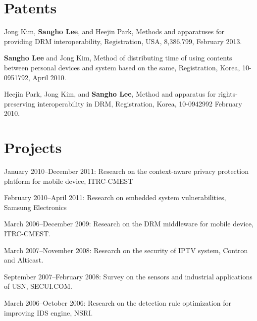 \documentclass[letterpaper]{article}
\renewenvironment{itemize}{
  \begin{list}{}{
    \setlength{\leftmargin}{1.5em}
  }
}{
  \end{list}
}
\begin{document}
\section*{Patents}
\begin{itemize}
  \item
 Jong Kim, {\bf Sangho Lee}, and Heejin Park,
 Methods and apparatuses for providing DRM interoperability,
 Registration, USA, 8,386,799,
 February 2013. 
 \item
 {\bf Sangho Lee} and Jong Kim,
 Method of distributing time of using contents between personal devices and system based on the same,
 Registration, Korea, 10-0951792,
 April 2010.
  \item
 Heejin Park, Jong Kim, and {\bf Sangho Lee},
 Method and apparatus for rights-preserving interoperability in DRM,
 Registration, Korea, 10-0942992
 February 2010. 
\end{itemize}

\section*{Projects}

\begin{itemize}
 \item January 2010--December 2011: Research on the context-aware privacy protection platform for mobile device, ITRC-CMEST
 \item February 2010--April 2011: Research on embedded system vulnerabilities, Samsung Electronics
 \item March 2006--December 2009: Research on the DRM middleware for mobile device, ITRC-CMEST.
 \item March 2007--November 2008: Research on the security of IPTV system, Contron and Alticast.
 \item September 2007--February 2008: Survey on the sensors and industrial applications of USN, SECUI.COM.
 \item March 2006--October 2006: Research on the detection rule optimization for improving IDS engine, NSRI.
\end{itemize}


\end{document}
